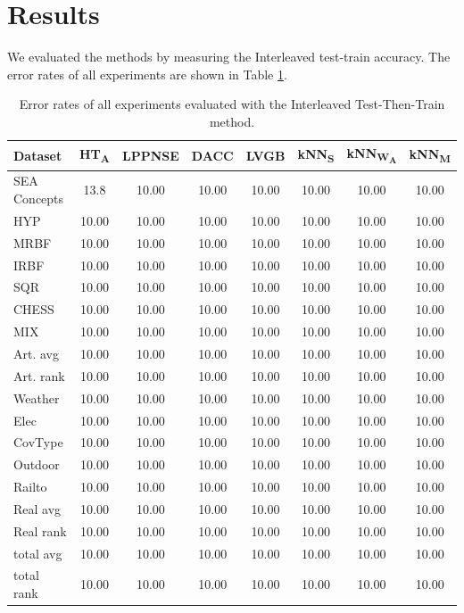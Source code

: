 \documentclass[conference]{IEEEtran}
\begin{document}
\section{Results}
We evaluated the methods by measuring the Interleaved test-train accuracy. The error rates of all experiments are shown
in Table \ref{tab:result}.\\
\begin{table}
\caption{Error rates of all experiments evaluated with the Interleaved Test-Then-Train method.}
\label{tab:result}
\centering
\begin{tabular}{l|ccccccc}
Dataset & HT\textsubscript{A} & LPPNSE &DACC& LVGB & kNN\textsubscript{S} & kNN\textsubscript{W\textsubscript{A}}& kNN\textsubscript{M}\\\hline
SEA Concepts & 13.8 & 10.00 & 10.00 & 10.00 & 10.00 & 10.00 & 10.00\\
HYP & 10.00 & 10.00 & 10.00 & 10.00 & 10.00 & 10.00 & 10.00\\ 
MRBF & 10.00 & 10.00 & 10.00 & 10.00 & 10.00 & 10.00 & 10.00\\
IRBF & 10.00 & 10.00 & 10.00 & 10.00 & 10.00 & 10.00 & 10.00\\
SQR & 10.00 & 10.00 & 10.00 & 10.00 & 10.00 & 10.00 & 10.00\\
CHESS & 10.00 & 10.00 & 10.00 & 10.00 & 10.00 & 10.00 & 10.00\\
MIX & 10.00 & 10.00 & 10.00 & 10.00 & 10.00 & 10.00 & 10.00\\\hline
Art. avg & 10.00 & 10.00 & 10.00 & 10.00 & 10.00 & 10.00 & 10.00\\\hline
Art. rank & 10.00 & 10.00 & 10.00 & 10.00 & 10.00 & 10.00 & 10.00\\\hline
Weather & 10.00 & 10.00 & 10.00 & 10.00 & 10.00 & 10.00 & 10.00\\
Elec & 10.00 & 10.00 & 10.00 & 10.00 & 10.00 & 10.00 & 10.00\\
CovType & 10.00 & 10.00 & 10.00 & 10.00 & 10.00 & 10.00 & 10.00\\
Outdoor & 10.00 & 10.00 & 10.00 & 10.00 & 10.00 & 10.00 & 10.00\\
Railto & 10.00 & 10.00 & 10.00 & 10.00 & 10.00 & 10.00 & 10.00\\\hline
Real avg& 10.00 & 10.00 & 10.00 & 10.00 & 10.00 & 10.00 & 10.00\\\hline
Real rank& 10.00 & 10.00 & 10.00 & 10.00 & 10.00 & 10.00 & 10.00\\\hline
total avg& 10.00 & 10.00 & 10.00 & 10.00 & 10.00 & 10.00 & 10.00\\\hline
total rank& 10.00 & 10.00 & 10.00 & 10.00 & 10.00 & 10.00 & 10.00\\\hline
\end{tabular}
\end{table}
\end{document}
